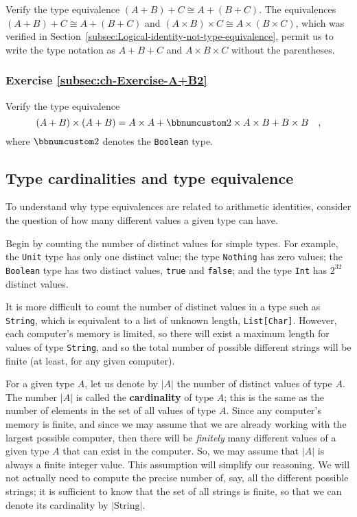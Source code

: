 Verify the type equivalence $\left(A+B\right)+C\cong A+\left(B+C\right)$.
The equivalences $\left(A+B\right)+C\cong A+\left(B+C\right)$ and
$\left(A\times B\right)\times C\cong A\times\left(B\times C\right)$,
which was verified in Section~\ref{subsec:Logical-identity-not-type-equivalence},
permit us to write the type notation as $A+B+C$ and $A\times B\times C$
without the parentheses.

\subsubsection{Exercise \label{subsec:ch-Exercise-A+B2}\ref{subsec:ch-Exercise-A+B2}}

Verify the type equivalence 
\[
\left(A+B\right)\times\left(A+B\right)=A\times A+\bbnum 2\times A\times B+B\times B\quad,
\]
where $\bbnum 2$ denotes the \lstinline!Boolean! type.

\subsection{Type cardinalities and type equivalence}

To understand why type equivalences are related to arithmetic identities,
consider the question of how many different values a given type can
have.

Begin by counting the number of distinct values for simple types.
For example, the \lstinline!Unit! type has only one distinct value;
the type \lstinline!Nothing! has zero values; the \lstinline!Boolean!
type has two distinct values, \lstinline!true! and \lstinline!false!;
and the type \lstinline!Int! has $2^{32}$ distinct values.

It is more difficult to count the number of distinct values in a type
such as \lstinline!String!, which is equivalent to a list of unknown
length, \lstinline!List[Char]!. However, each computer's memory is
limited, so there will exist a maximum length for values of type \lstinline!String!,
and so the total number of possible different strings will be finite
(at least, for any given computer).

For a given type $A$, let us denote by $\left|A\right|$ the number
of distinct values of type $A$. The number $\left|A\right|$ is called
the \textbf{cardinality} of type $A$; this is
the same as the number of elements in the set of all values of type
$A$. Since any computer's memory is finite, and since we may assume
that we are already working with the largest possible computer, then
there will be \emph{finitely} many different values of a given type
$A$ that can exist in the computer. So, we may assume that $\left|A\right|$
is always a finite integer value. This assumption will simplify our
reasoning. We will not actually need to compute the precise number
of, say, all the different possible strings; it is sufficient to know
that the set of all strings is finite, so that we can denote its cardinality
by $\left|\text{String}\right|$.

